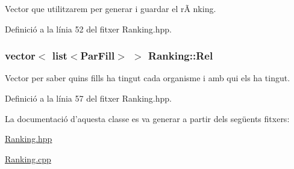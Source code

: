 Vector que utilitzarem per generar i guardar el rÃ nking. 



Definició a la línia 52 del fitxer Ranking.\-hpp.

\hypertarget{class_ranking_a714b5b8881dccd99dad7e58b81ce7769}{
\subsubsection[{Rel}]{\setlength{\rightskip}{0pt plus 5cm}vector$<$ list$<${\bf Par\-Fill}$>$ $>$ Ranking\-::\-Rel\hspace{0.3cm}{\ttfamily [private]}}}\label{class_ranking_a714b5b8881dccd99dad7e58b81ce7769}


Vector per saber quins fills ha tingut cada organisme i amb qui els ha tingut. 



Definició a la línia 57 del fitxer Ranking.\-hpp.



La documentació d'aquesta classe es va generar a partir dels següents fitxers\-:\begin{DoxyCompactItemize}
\item 
\hyperlink{_ranking_8hpp}{Ranking.\-hpp}\item 
\hyperlink{_ranking_8cpp}{Ranking.\-cpp}\end{DoxyCompactItemize}
